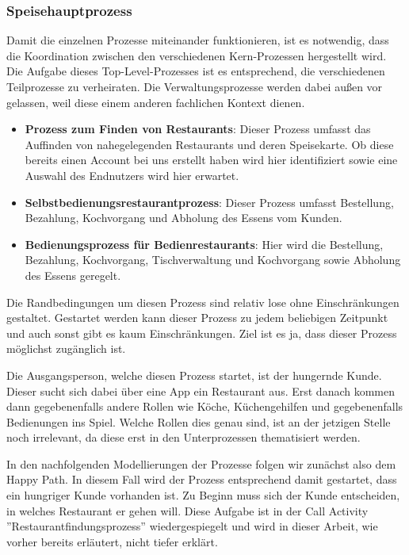 \subsubsection{Speisehauptprozess}
Damit die einzelnen Prozesse miteinander funktionieren, ist es notwendig, dass die Koordination zwischen den verschiedenen Kern-Prozessen hergestellt wird. Die Aufgabe dieses Top-Level-Prozesses ist es entsprechend, die verschiedenen Teilprozesse zu verheiraten. Die Verwaltungsprozesse werden dabei außen vor gelassen, weil diese einem anderen fachlichen Kontext dienen. 

\begin{itemize}
    \item \textbf{Prozess zum Finden von Restaurants}: Dieser Prozess umfasst das Auffinden von nahegelegenden Restaurants und deren Speisekarte. Ob diese bereits einen Account bei uns erstellt haben wird hier identifiziert sowie eine Auswahl des Endnutzers wird hier erwartet.
    
    \item \textbf{Selbstbedienungsrestaurantprozess}: Dieser Prozess umfasst Bestellung, Bezahlung, Kochvorgang und Abholung des Essens vom Kunden.
    
    \item \textbf{Bedienungsprozess für Bedienrestaurants}: Hier wird die Bestellung, Bezahlung, Kochvorgang, Tischverwaltung und Kochvorgang sowie Abholung des Essens geregelt. 
\end{itemize}

Die Randbedingungen um diesen Prozess sind relativ lose ohne Einschränkungen gestaltet. Gestartet werden kann dieser Prozess zu jedem beliebigen Zeitpunkt und auch sonst gibt es kaum Einschränkungen. Ziel ist es ja, dass dieser Prozess möglichst zugänglich ist.

Die Ausgangsperson, welche diesen Prozess startet, ist der hungernde Kunde. Dieser sucht sich dabei über eine App ein Restaurant aus. Erst danach kommen dann gegebenenfalls andere Rollen wie Köche, Küchengehilfen und gegebenenfalls Bedienungen ins Spiel. Welche Rollen dies genau sind, ist an der jetzigen Stelle noch irrelevant, da diese erst in den Unterprozessen thematisiert werden. 

\clearpage
{}


In den nachfolgenden Modellierungen der Prozesse folgen wir zunächst also dem Happy Path. In diesem Fall wird der Prozess entsprechend damit gestartet, dass ein hungriger Kunde vorhanden ist. Zu Beginn muss sich der Kunde entscheiden, in welches Restaurant er gehen will. Diese Aufgabe ist in der Call Activity ''Restaurantfindungsprozess'' wiedergespiegelt und wird in dieser Arbeit, wie vorher bereits erläutert, nicht tiefer erklärt. 

